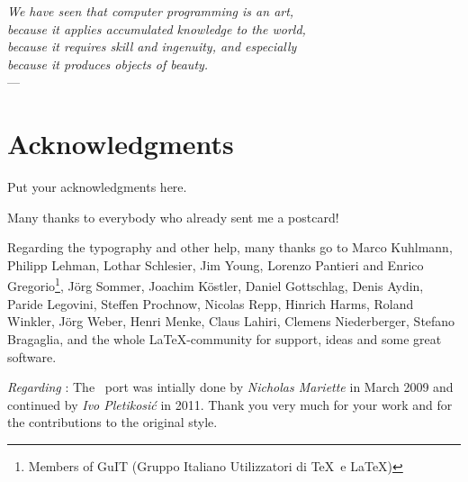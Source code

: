 
\begin{flushright}{\slshape    
    We have seen that computer programming is an art, \\ 
    because it applies accumulated knowledge to the world, \\ 
    because it requires skill and ingenuity, and especially \\
    because it produces objects of beauty.} \\ \medskip
    ---  \citep{knuth:1974}
\end{flushright}



\bigskip

\begingroup
\let\clearpage\relax
\let\cleardoublepage\relax
\let\cleardoublepage\relax
\chapter*{Acknowledgments}
Put your acknowledgments here.

Many thanks to everybody who already sent me a postcard!

Regarding the typography and other help, many thanks go to Marco 
Kuhlmann, Philipp Lehman, Lothar Schlesier, Jim Young, Lorenzo 
Pantieri and Enrico Gregorio\footnote{Members of GuIT (Gruppo 
Italiano Utilizzatori di \TeX\ e \LaTeX )}, J\"org Sommer, 
Joachim K\"ostler, Daniel Gottschlag, Denis Aydin, Paride 
Legovini, Steffen Prochnow, Nicolas Repp, Hinrich Harms, 
 Roland Winkler, J\"org Weber, Henri Menke, Claus Lahiri, 
 Clemens Niederberger, Stefano Bragaglia, 
 and the whole \LaTeX-community for support, ideas and 
 some great software.

\bigskip

\noindent\emph{Regarding \mLyX}: The \mLyX\ port was intially done by 
\emph{Nicholas Mariette} in March 2009 and continued by 
\emph{Ivo Pletikosi\'c} in 2011. Thank you very much for your 
work and for the contributions to the original style.


\endgroup



